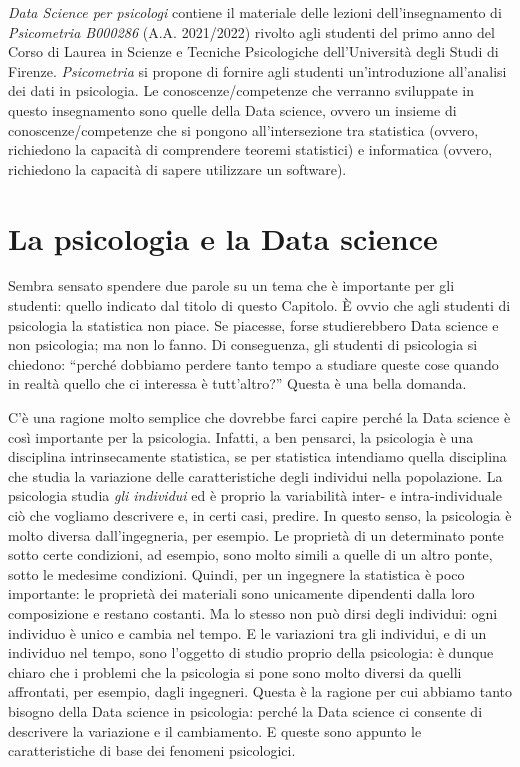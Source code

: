 \documentclass[
  11pt,
]{krantz}
\theoremstyle{definition}
\theoremstyle{definition}
\theoremstyle{definition}
\theoremstyle{definition}
\theoremstyle{remark}
\begin{document}
\emph{Data Science per psicologi} contiene il materiale delle lezioni dell'insegnamento di \emph{Psicometria B000286} (A.A. 2021/2022) rivolto agli studenti del primo anno del Corso di Laurea in Scienze e Tecniche Psicologiche dell'Università degli Studi di Firenze. \emph{Psicometria} si propone di fornire agli studenti un'introduzione all'analisi dei dati in psicologia. Le conoscenze/competenze che verranno sviluppate in questo insegnamento sono quelle della Data science, ovvero un insieme di conoscenze/competenze che si pongono all'intersezione tra statistica (ovvero, richiedono la capacità di comprendere teoremi statistici) e informatica (ovvero, richiedono la capacità di sapere utilizzare un software).

\hypertarget{la-psicologia-e-la-data-science}{%
\section*{La psicologia e la Data science}\label{la-psicologia-e-la-data-science}}


Sembra sensato spendere due parole su un tema che è importante per gli studenti: quello indicato dal titolo di questo Capitolo. È ovvio che agli studenti di psicologia la statistica non piace. Se piacesse, forse studierebbero Data science e non psicologia; ma non lo fanno. Di conseguenza, gli studenti di psicologia si chiedono: ``perché dobbiamo perdere tanto tempo a studiare queste cose quando in realtà quello che ci interessa è tutt'altro?'' Questa è una bella domanda.

C'è una ragione molto semplice che dovrebbe farci capire perché la Data science è così importante per la psicologia. Infatti, a ben pensarci, la psicologia è una disciplina intrinsecamente statistica, se per statistica intendiamo quella disciplina che studia la variazione delle caratteristiche degli individui nella popolazione. La psicologia studia \emph{gli individui} ed è proprio la variabilità inter- e intra-individuale ciò che vogliamo descrivere e, in certi casi, predire. In questo senso, la psicologia è molto diversa dall'ingegneria, per esempio. Le proprietà di un determinato ponte sotto certe condizioni, ad esempio, sono molto simili a quelle di un altro ponte, sotto le medesime condizioni. Quindi, per un ingegnere la statistica è poco importante: le proprietà dei materiali sono unicamente dipendenti dalla loro composizione e restano costanti. Ma lo stesso non può dirsi degli individui: ogni individuo è unico e cambia nel tempo. E le variazioni tra gli individui, e di un individuo nel tempo, sono l'oggetto di studio proprio della psicologia: è dunque chiaro che i problemi che la psicologia si pone sono molto diversi da quelli affrontati, per esempio, dagli ingegneri. Questa è la ragione per cui abbiamo tanto bisogno della Data science in psicologia: perché la Data science ci consente di descrivere la variazione e il cambiamento. E queste sono appunto le caratteristiche di base dei fenomeni psicologici.
\end{document}
